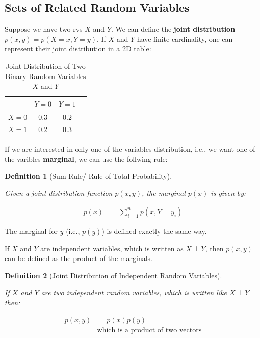 \documentclass{article}
\newtheorem{definition}{Definition}[section]
\begin{document}
\subsection{Sets of Related Random Variables}

Suppose we have two rvs $X$ and $Y$. We can define the \textbf{joint distribution} $p(x,y) = p(X = x, Y= y)$. If  $X$ and $Y$ have finite cardinality, one can represent their joint distribution in a 2D table:

\begin{table}[H]
	\centering
	\caption{Joint Distribution of Two Binary Random Variables $X$ and $Y$}
	\begin{tabular}{|c|c|c|c|}
		\hline
		& $Y = 0$ & $Y =  1$  \\ \hline
		$X = 0$ & $0.3$  & $0.2$  \\ \hline
		$X = 1$ & $0.2$ & $0.3$ \\ \hline
	\end{tabular}
\end{table}

If we are interested in only one of the variables distribution, i.e., we want one of the varibles \textbf{marginal}, we can use the follwing rule:

\begin{definition}[Sum Rule/ Rule of Total Probability]
	\label{def:sum_rule}
	
	Given a joint distribution function  $p(x,y)$, the marginal $p(x)$ is given by:
 	
	\begin{align}
		p(x) &= \sum_{i = 1}^{n} p(x, Y = y_i)
	\end{align}
	
\end{definition}

The marginal for $y$ (i.e., $p(y)$) is defined exactly the same way.

If $X$ and $Y$ are independent variables, which is written as $X \perp Y$, then  $p(x,y)$ can be defined as the product of the marginals.

\begin{definition}[Joint Distribution of Independent Random Variables]
	\label{def:joint_dist_of_indep_rvs}
	
	If $X$ and $Y$ are two independent random variables, which is written like  $X \perp Y$ then:
	
	\begin{align}
		p(x,y) &= p(x)p(y)\\
		& \text{which is a product of two vectors}
	\end{align}
	
\end{definition}
\end{document}
